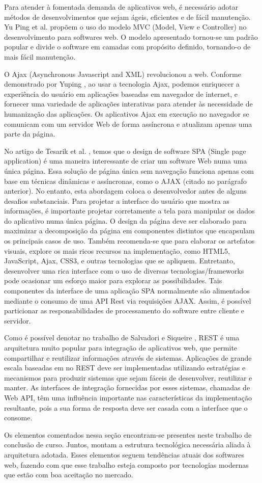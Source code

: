 Para atender à fomentada demanda de aplicativos web, é necessário adotar métodos de desenvolvimentos que sejam ágeis, eficientes e de fácil manutenção. Yu Ping et al. \cite{1372143} propõem o uso do modelo MVC (Model, View e Controller) no desenvolvimento para softwares web. O modelo apresentado tornou-se um padrão popular e divide o software em camadas com propósito definido, tornando-o de mais fácil manutenção.


O Ajax (Asynchronous Javascript and XML) revolucionou a web. Conforme demonstrado por Yuping \citep{6845605}, ao usar a tecnologia Ajax, podemos enriquecer a experiência do usuário em aplicações baseadas em navegador de internet, e fornecer uma variedade de aplicações interativas para atender às necessidade de humanização das aplicações.
Os aplicativos Ajax em execução no navegador se comunicam com um servidor Web de forma assíncrona e atualizam apenas uma parte da página.


No artigo de Tesarik et al. \citep{4664349}, temos que o design de software SPA (Single page application) é uma maneira interessante de criar um software Web numa uma única página. Essa solução de página única sem navegação funciona apenas com base em técnicas dinâmicas e assíncronas, como o AJAX (citado no parágrafo anterior). No entanto, esta abordagem coloca o desenvolvedor antes de alguns desafios substanciais.
Para projetar a interface do usuário que mostra as informações, é importante projetar corretamente a tela para manipular os dados do aplicativo numa única página. O design da página deve ser elaborado para maximizar a decomposição da página em componentes distintos que encapsulam os principais casos de uso.
Também recomenda-se que para elaborar os artefatos visuais, explore os mais ricos recursos na implementação, como HTML5, JavaScript, Ajax, CSS3, e outras tecnologias que se apliquem. Entretanto, desenvolver uma rica interface com o uso de diversas tecnologias/frameworks pode ocasionar um esforço maior para explorar as possibilidades.
Tais componentes da interface de uma aplicação SPA normalmente são alimentados mediante o consumo de uma API Rest via requisições AJAX. Assim, é possível particionar as responsabilidades de processamento do software entre cliente e servidor.


Como é possível denotar no trabalho de Salvadori e Siqueire \citep{7195633}, REST é uma arquitetura muito popular para integração de aplicativos web, que permite compartilhar e reutilizar informações através de sistemas. Aplicações de grande escala baseadas em no REST deve ser implementadas utilizando estratégias e mecanismos para produzir sistemas que sejam fáceis de desenvolver, reutilizar e manter. As interfaces de integração fornecidas por esses sistemas, chamadas de Web API, têm uma influência importante nas características da implementação resultante, pois a sua forma de resposta deve ser casada com a interface que o consome.
 
 
Os elementos comentados nessa seção encontram-se presentes neste trabalho de conclusão de curso. Juntos, montam a estrutura tecnológica necessária aliada à arquitetura adotada. Esses elementos seguem tendências atuais dos softwares web, fazendo com que esse trabalho esteja composto por tecnologias modernas que estão com boa aceitação no mercado.